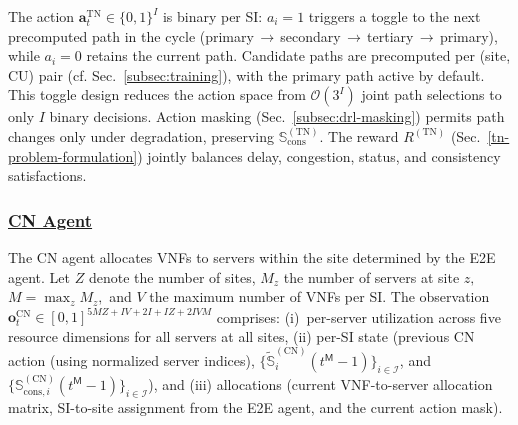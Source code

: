 \documentclass[12pt,lettersize,journal,onecolumn]{IEEEtran}
\begin{document}
The action $\mathbf{a}^{\text{TN}}_t \in \{0,1\}^{I}$ is binary per SI: $a_i=1$ triggers a toggle to the next precomputed path in the cycle (primary\,$\to$\,secondary\,$\to$\,tertiary\,$\to$\,primary), while $a_i=0$ retains the current path. Candidate paths are precomputed per (site, CU) pair (cf. Sec.~\ref{subsec:training}), with the primary path active by default. 
This toggle design reduces the action space from $\mathcal{O}(3^{I})$ joint path selections to only $I$ binary decisions. Action masking (Sec.~\ref{subsec:drl-masking}) permits path changes only under degradation, preserving $\mathbb{S}^{\mathrm{(TN)}}_{\mathrm{cons}}.$ The reward $R^{\mathrm{(TN)}}$ (Sec.~\ref{tn-problem-formulation}) jointly balances delay, congestion, status, and consistency satisfactions.

\subsubsection{\underline{CN Agent}} \label{subsubsec:pomdp-cn}
The CN agent allocates VNFs to servers within the site determined by the E2E agent. Let $Z$ denote the number of sites, $M_z$ the number of servers at site $z,$ $M=\max_z M_z,$ and $V$ the maximum number of VNFs per SI. The observation $\mathbf{o}^{\text{CN}}_t \in [0,1]^{5MZ + IV + 2I + IZ + 2IVM}$ comprises: 
(i)~per-server utilization across five resource dimensions for all servers at all sites, 
(ii) per-SI state (previous CN action (using normalized server indices), $\{\tilde{\mathbb{S}}^{\mathrm{(CN)}}_{i}(t^\mathsf{M}-1)\}_{i\in\mathcal{I}}$, and $\{\mathbb{S}^{\mathrm{(CN)}}_{\mathrm{cons},i}(t^\mathsf{M}-1)\}_{i\in\mathcal{I}}$), and 
(iii) allocations (current VNF-to-server allocation matrix, SI-to-site assignment from the E2E agent, and the current action mask).
\end{document}
